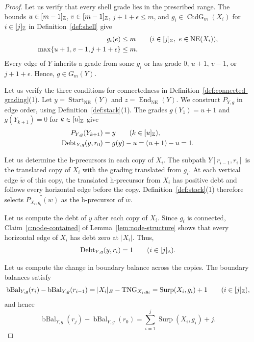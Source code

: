 \begin{proof}
 Let us verify that every shell grade lies in the prescribed range.
The bounds $u\in[m-1]_{\mathbb Z}$, $v\in[m-1]_{\mathbb Z}$, $j+1+\epsilon\le m$, and $g_i\in\operatorname{CtdG}_m(X_i)$ for $i\in[j]_{\mathbb Z}$ in
Definition~\ref{def:shell} give
\[
\begin{aligned}
 g_i(e)&\le m\qquad(i\in[j]_{\mathbb Z},\ e\in\operatorname{NE}(X_i)),\\
 \max\{u+1,v-1,j+1+\epsilon\}&\le m.
\end{aligned}
\]
Every edge of $Y$ inherits a grade from some $g_i$ or has grade
$0$, $u+1$, $v-1$, or $j+1+\epsilon$. Hence, $g\in G_m(Y)$.

 Let us verify the three conditions for connectedness in Definition~\ref{def:connected-grading}(1).
Let $y=\operatorname{Start}_{\mathrm{NE}}(Y)$ and $z=\operatorname{End}_{\mathrm{NE}}(Y)$.
We construct $P_{Y,g}$ in edge order, using Definition~\ref{def:stack}(1).
The grades $g(Y_1)=u+1$ and $g(Y_{k+1})=0$ for $k\in[u]_{\mathbb Z}$ give
\[
\begin{aligned}
 P_{Y,g}(Y_{k+1})&=y\qquad(k\in[u]_{\mathbb Z}),\\
 \operatorname{Debt}_{Y,g}(y,r_0)&=g(y)-u=(u+1)-u=1.
\end{aligned}
\]

Let us determine the h-precursors in each copy of $X_i$.
The subpath $Y[r_{i-1},r_i]$ is the translated copy of $X_i$ with the grading translated from $g_i$.
At each vertical edge $\widetilde w$ of this copy, the translated h-precursor from $X_i$ has positive debt and follows every horizontal edge before the copy.
Definition~\ref{def:stack}(1) therefore selects $\widetilde{P_{X_i,g_i}(w)}$ as the h-precursor of $\widetilde w$.

Let us compute the debt of $y$ after each copy of $X_i$.
Since $g_i$ is connected, Claim~\ref{c:node-contained} of Lemma~\ref{lem:node-structure}
shows that every horizontal edge of $X_i$ has debt zero at $|X_i|$.
Thus,
\[
 \operatorname{Debt}_{Y,g}(y,r_i)=1
 \qquad(i\in[j]_{\mathbb Z}).
\]

Let us compute the change in boundary balance across the copies.
The boundary balances satisfy
\[
 \operatorname{bBal}_{Y,g}(r_i)-\operatorname{bBal}_{Y,g}(r_{i-1})
 =|X_i|_E-\operatorname{TNG}_{X_i,g_i}
 =\operatorname{Surp}(X_i,g_i)+1
 \qquad(i\in[j]_{\mathbb Z}),
\]
and hence
\[
 \operatorname{bBal}_{Y,g}(r_j)-\operatorname{bBal}_{Y,g}(r_0)
 =\sum_{i=1}^j\operatorname{Surp}(X_i,g_i)+j.
\]


\end{proof}
